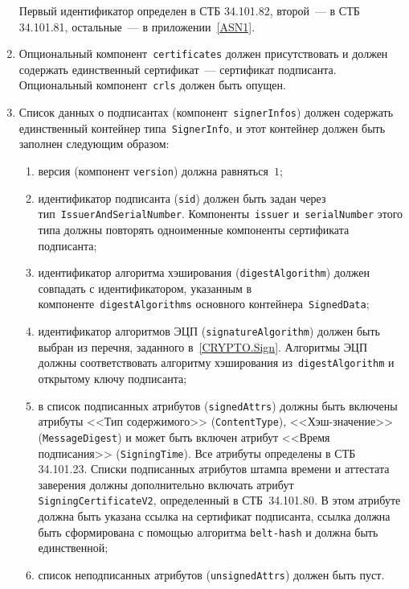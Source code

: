 \begin{enumerate}
Первый идентификатор определен в СТБ 34.101.82, второй~--- в СТБ 
34.101.81, остальные~--- в приложении~\ref{ASN1}.

\item
Опциональный компонент~\texttt{certificates} должен присутствовать и 
должен содержать единственный сертификат~--- сертификат подписанта.
%
Опциональный компонент~\texttt{crls} должен быть опущен.

\item
Список данных о подписантах (компонент~\texttt{signerInfos}) должен 
содержать единственный контейнер типа~\texttt{SignerInfo}, и этот 
контейнер должен быть заполнен следующим образом: 
\begin{enumerate}
\item
версия (компонент \texttt{version}) должна равняться~$1$;
\item
идентификатор подписанта (\texttt{sid}) должен быть задан через
тип~\texttt{IssuerAndSerialNumber}. Компоненты~\texttt{issuer} 
и~\texttt{serialNumber} этого типа должны повторять одноименные компоненты 
сертификата подписанта;
\item
идентификатор алгоритма хэширования (\texttt{digestAlgorithm}) должен 
совпадать с идентификатором, указанным в 
компоненте~\texttt{digestAlgorithms} основного  
контейнера~\texttt{SignedData};
\item
идентификатор алгоритмов ЭЦП (\texttt{signatureAlgorithm}) должен 
быть выбран из перечня, заданного в~\ref{CRYPTO.Sign}. 
Алгоритмы ЭЦП должны соответствовать алгоритму хэширования
из~\texttt{digestAlgorithm} и открытому ключу подписанта;
\item
в список подписанных атрибутов (\texttt{signedAttrs}) должны 
быть включены атрибуты <<Тип содержимого>> (\texttt{ContentType}),
<<Хэш-значение>> (\texttt{MessageDigest}) и может быть включен
атрибут <<Время подписания>> (\texttt{SigningTime}). 
Все атрибуты определены в СТБ 34.101.23.
%
Списки подписанных атрибутов штампа времени и аттестата заверения должны 
дополнительно включать атрибут \texttt{SigningCertificateV2}, определенный в 
СТБ~34.101.80. В этом атрибуте должна быть указана ссылка на сертификат 
подписанта, ссылка должна быть сформирована с помощью алгоритма 
\texttt{belt-hash} и должна быть единственной;
\item
список неподписанных атрибутов (\texttt{unsignedAttrs}) должен быть пуст.
\end{enumerate}
\end{enumerate}
